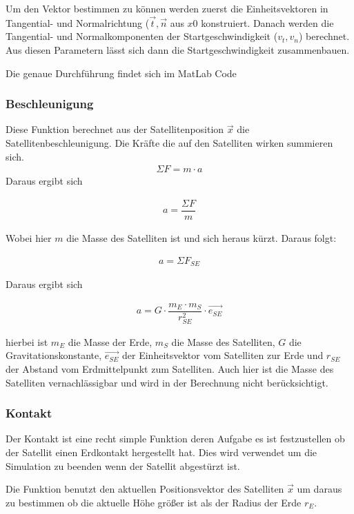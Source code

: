 \documentclass[]{scrartcl}
\begin{document}
Um den Vektor bestimmen zu können werden zuerst die Einheitsvektoren in Tangential- und Normalrichtung ($\vec{t}, \vec{n}$ aus $x0$ konstruiert. Danach werden die Tangential- und Normalkomponenten der Startgeschwindigkeit ($v_t , v_n$) berechnet. Aus diesen Parametern lässt sich dann die Startgeschwindigkeit zusammenbauen.

Die genaue Durchführung findet sich im MatLab Code

\subsubsection{Beschleunigung}
Diese Funktion berechnet aus der Satellitenposition $\vec{x}$ die Satellitenbeschleunigung.
Die Kräfte die auf den Satelliten wirken summieren sich. 
\begin{align}
\Sigma{F} = m \cdot a
\end{align}
Daraus ergibt sich 

\begin{align}
a = \dfrac{\Sigma F}{m}
\end{align}

Wobei hier $m$ die Masse des Satelliten ist und sich heraus kürzt. Daraus folgt:

\begin{align}
a = \Sigma{F}_{SE}
\end{align}

Daraus ergibt sich

\begin{align}
a = G \cdot \dfrac{m_E \cdot m_S }{r^2_{SE}} \cdot \vec{e_{SE}}
\end{align}

hierbei ist $m_E$ die Masse der Erde, $m_S$ die Masse des Satelliten, $G$ die Gravitationskonstante, $\vec{e_{SE}}$  der Einheitsvektor vom Satelliten zur Erde und $r_{SE}$ der Abstand vom Erdmittelpunkt zum Satelliten. Auch hier ist die Masse des Satelliten vernachlässigbar und wird in der Berechnung nicht berücksichtigt.

\subsubsection{Kontakt}

Der Kontakt ist eine recht simple Funktion deren Aufgabe es ist festzustellen ob der Satellit einen Erdkontakt hergestellt hat. Dies wird verwendet um die Simulation zu beenden wenn der Satellit abgestürzt ist.

Die Funktion benutzt den aktuellen Positionsvektor des Satelliten $\vec{x}$ um daraus zu bestimmen ob die aktuelle Höhe größer ist als der Radius der Erde $r_E$.
\end{document}
